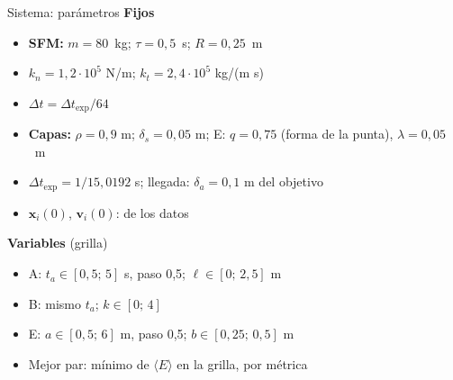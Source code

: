 \documentclass[aspectratio=43,11pt]{beamer}
\begin{document}
\begin{frame}{Sistema: parámetros}
  \footnotesize
  \textbf{Fijos}
  \begin{itemize}[itemsep=1pt,topsep=2pt]
    \item \textbf{SFM:} $m = 80$~kg; $\tau = 0{,}5$~s; $R = 0{,}25$~m
    \item $k_n = 1{,}2\cdot 10^5$ N/m; $k_t = 2{,}4\cdot 10^5$ kg/(m s)
    \item $\Delta t = \Delta t_{\mathrm{exp}}/64$
  \end{itemize}
  \begin{itemize}[itemsep=1pt,topsep=2pt]
    \item \textbf{Capas:} $\rho = 0{,}9$ m; $\delta_s = 0{,}05$ m; E: $q = 0{,}75$ (forma de la punta), $\lambda = 0{,}05$~m
    \item $\Delta t_{\mathrm{exp}} = 1/15{,}0192$ s; llegada: $\delta_a = 0{,}1$ m del objetivo
    \item $\mathbf{x}_i(0)$, $\mathbf{v}_i(0)$: de los datos
  \end{itemize}
  \par\vspace{0.5mm}
  \textbf{Variables} (grilla)
  \begin{itemize}[itemsep=1pt,topsep=2pt]
    \item A: $t_a \in [0{,}5;\,5]$ s, paso 0,5; $\ell \in [0;\,2{,}5]$ m
    \item B: mismo $t_a$; $k \in [0;\,4]$
    \item E: $a \in [0{,}5;\,6]$ m, paso 0,5; $b \in [0{,}25;\,0{,}5]$ m
    \item Mejor par: mínimo de $\langle E\rangle$ en la grilla, por métrica
  \end{itemize}
  \par\vspace{0.5mm}
\end{frame}
\end{document}
